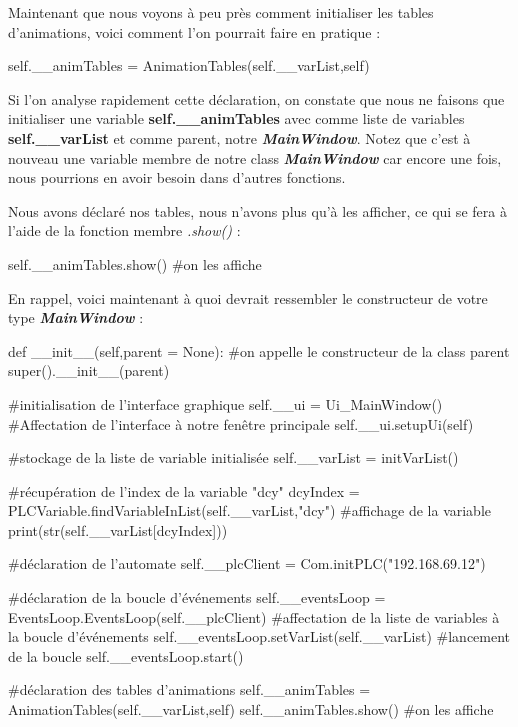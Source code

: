 \documentclass[12pt]{report}    %
\newcommand{\bold}[1]{{\bfseries #1}}
\newcommand{\italic}[1]{{\itshape #1}}
\newcommand{\ib}[1]{{\bfseries\itshape #1}}
\newcommand{\smallSkip}{\vskip 0.5cm}
\newcommand{\eFunc}[1]{\italic{#1}} %
\newcommand{\eType}[1]{\ib{#1}}
\newcommand{\eVar}[1]{\bold{#1}}
\begin{document}
Maintenant que nous voyons à peu près comment initialiser les tables d'animations, voici comment l'on pourrait faire en pratique :
\begin{pyCode}
self.__animTables = AnimationTables(self.__varList,self)
\end{pyCode}
Si l'on analyse rapidement cette déclaration, on constate que nous ne faisons que initialiser une variable \eVar{self.\_\_animTables} avec comme liste de variables \eVar{self.\_\_varList} et comme parent, notre \eType{MainWindow}.\newline
Notez que c'est à nouveau une variable membre de notre class \eType{MainWindow} car encore une fois, nous pourrions en avoir besoin dans d'autres fonctions.\smallSkip

Nous avons déclaré nos tables, nous n'avons plus qu'à les afficher, ce qui se fera à l'aide de la fonction membre \eFunc{.show()} :
\begin{pyCode}
self.__animTables.show() #on les affiche
\end{pyCode}
\smallSkip

En rappel, voici maintenant à quoi devrait ressembler le constructeur de votre type \eType{MainWindow} :
\begin{pyCode}
def __init__(self,parent = None):
	#on appelle le constructeur de la class parent
	super().__init__(parent)

	#initialisation de l'interface graphique
	self.__ui = Ui_MainWindow()
	#Affectation de l'interface à notre fenêtre principale
	self.__ui.setupUi(self)

	#stockage de la liste de variable initialisée
	self.__varList = initVarList()

	#récupération de l'index de la variable "dcy"
	dcyIndex = PLCVariable.findVariableInList(self.__varList,"dcy")
	#affichage de la variable
	print(str(self.__varList[dcyIndex]))

	#déclaration de l'automate
	self.__plcClient = Com.initPLC("192.168.69.12")
		

	#déclaration de la boucle d'événements
	self.__eventsLoop = EventsLoop.EventsLoop(self.__plcClient)
	#affectation de la liste de variables à la boucle d'événements
	self.__eventsLoop.setVarList(self.__varList)
	#lancement de la boucle
	self.__eventsLoop.start()


	#déclaration des tables d'animations
	self.__animTables = AnimationTables(self.__varList,self)
	self.__animTables.show() #on les affiche
\end{pyCode}
\smallSkip
\end{document}
